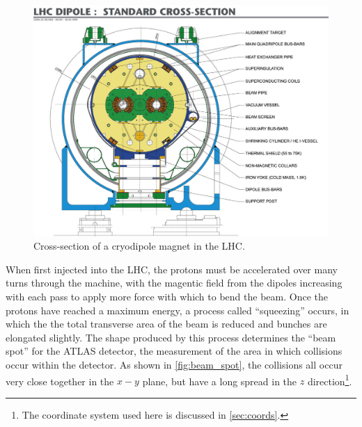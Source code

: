 \begin{centering}
\begin{figure}[!hbt]
\myfloatalign
\includegraphics[width=.90\linewidth]{figures/lhc/magnet.jpg}
\caption{Cross-section of a cryodipole magnet in the \ac{LHC}.}
\label{fig:magnet}
\end{figure}
\end{centering}

When first injected into the \ac{LHC}, the protons must be accelerated over many turns through the machine, with the magentic field from the dipoles increasing with each pass to apply more force with which to bend the beam. Once the protons have reached a maximum energy, a process called ``squeezing'' occurs, in which the the total transverse area of the beam is reduced and bunches are elongated slightly. The shape produced by this process determines the ``beam spot'' for the ATLAS detector, the measurement of the area in which collisions occur within the detector. As shown in \autoref{fig:beam_spot}, the collisions all occur very close together in the $x-y$ plane, but have a long spread in the $z$ direction\footnote{The coordinate system used here is discussed in \autoref{sec:coords}.}.


